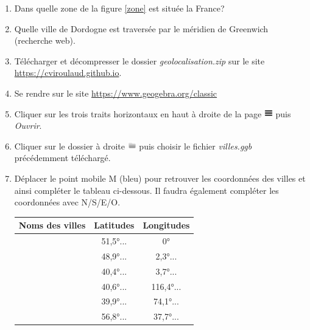 \documentclass[a4paper,11pt]{article}
\begin{document}
\begin{activite}
    \begin{enumerate}
        \item Dans quelle zone de la figure \ref{zone} est située la France?
        \item Quelle ville de Dordogne est traversée par le méridien de Greenwich (recherche web).
        \item Télécharger et décompresser le dossier \emph{geolocalisation.zip} sur le site \url{https://cviroulaud.github.io}.
        \item Se rendre sur le site \url{https://www.geogebra.org/classic}
        \item Cliquer sur les trois traits horizontaux en haut à droite de la page \includegraphics[height=1em]{ressources/hamburger.png} puis \emph{Ouvrir}.
        \item Cliquer sur le dossier à droite \includegraphics[height=1em]{ressources/folder.png} puis choisir le fichier \emph{villes.ggb} précédemment téléchargé.
        \item Déplacer le point mobile M (bleu) pour retrouver les coordonnées des villes et ainsi compléter le tableau ci-dessous. Il faudra également compléter les coordonnées avec N/S/E/O.
              \begin{center}
                  \begin{tabular}{|*{3}{c|}}
                      \hline
                      Noms des villes & Latitudes & Longitudes \\
                      \hline
                                      & 51,5°...  & 0°         \\
                      \hline
                                      & 48,9°...  & 2,3°...    \\
                      \hline
                                      & 40,4°...  & 3,7°...    \\
                      \hline
                                      & 40,6°...  & 116,4°...  \\
                      \hline
                                      & 39,9°...  & 74,1°...   \\
                      \hline
                                      & 56,8°...  & 37,7°...   \\
                      \hline
                  \end{tabular}
              \end{center}
    \end{enumerate}
\end{activite}
\end{document}
